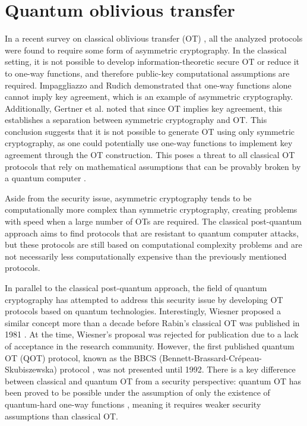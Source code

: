 


%

\chapter{Quantum oblivious transfer}
\label{chapter_QOT}


In a recent survey on classical oblivious transfer (OT) \cite{YAVV22}, all the analyzed protocols were found to require some form of asymmetric cryptography. In the classical setting, it is not possible to develop information-theoretic secure OT or reduce it to one-way functions, and therefore public-key computational assumptions are required. Impaggliazzo and Rudich \cite{IR89} demonstrated that one-way functions alone cannot imply key agreement, which is an example of asymmetric cryptography. Additionally, Gertner et al. \cite{GKMRV00} noted that since OT implies key agreement, this establishes a separation between symmetric cryptography and OT. This conclusion suggests that it is not possible to generate OT using only symmetric cryptography, as one could potentially use one-way functions to implement key agreement through the OT construction. This poses a threat to all classical OT protocols \cite{EGL85, NP01, CO15} that rely on mathematical assumptions that can be provably broken by a quantum computer \cite{Sho95}.

Aside from the security issue, asymmetric cryptography tends to be computationally more complex than symmetric cryptography, creating problems with speed when a large number of OTs are required. The classical post-quantum approach aims to find protocols that are resistant to quantum computer attacks, but these protocols are still based on computational complexity problems and are not necessarily less computationally expensive than the previously mentioned protocols.

In parallel to the classical post-quantum approach, the field of quantum cryptography has attempted to address this security issue by developing OT protocols based on quantum technologies. Interestingly, Wiesner proposed a similar concept more than a decade before Rabin's classical OT was published in 1981 \cite{Rabin81}. At the time, Wiesner's proposal was rejected for publication due to a lack of acceptance in the research community. However, the first published quantum OT (QOT) protocol, known as the BBCS (Bennett-Brassard-Cr{\'e}peau-Skubiszewska) protocol \cite{BBCS92}, was not presented until 1992. There is a key difference between classical and quantum OT from a security perspective: quantum OT has been proved to be possible under the assumption of only the existence of quantum-hard one-way functions \cite{GLSV21, BCKM21}, meaning it requires weaker security assumptions than classical OT.

